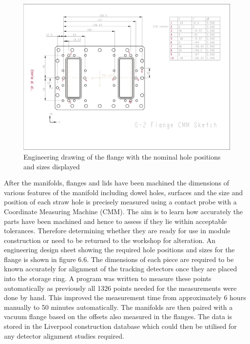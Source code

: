 \begin{figure}[th]
\centering
\includegraphics[scale=0.3]{Figures/Flangedrawing.pdf}
\decoRule
\caption{Engineering drawing of the flange with the nominal hole positions and sizes displayed}
\label{fig:Flangedrawing}
\end{figure}

After the manifolds, flanges and lids have been machined the dimensions of various features of the manifold including dowel holes, surfaces and the size and position of each straw hole is precisely measured using a contact probe with a Coordinate Measuring Machine (CMM). The aim is to learn how accurately the parts have been machined and hence to assess if they lie within acceptable tolerances. Therefore determining whether they are ready for use in module construction or need to be returned to the workshop for alteration. An engineering design sheet showing the required hole positions and sizes for the flange is shown in figure 6.6. The dimensions of each piece are required to be known accurately for alignment of the tracking detectors once they are placed into the storage ring. A program was written to measure these points automatically as previously all 1326 points needed for the measurements were done by hand. This improved the measurement time from approximately 6 hours manually to 50 minutes automatically. The manifolds are then paired with a vacuum flange based on the offsets also measured in the flanges. The data is stored in the Liverpool construction database which could then be utilised for any detector alignment studies required.

